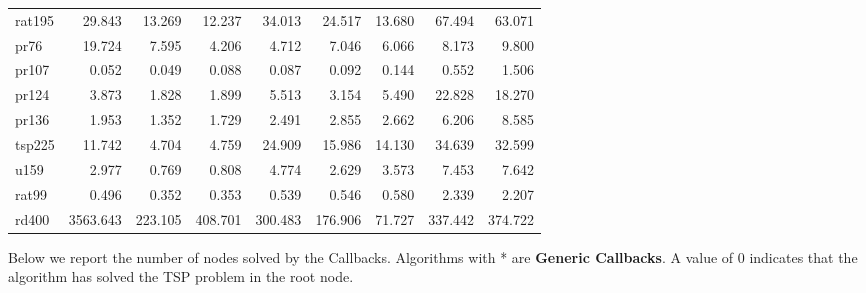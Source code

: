 \begin{center}
\begin{longtable}{lrrrrrrrr}
rat195  & 29.843 & 13.269 & 12.237 & 34.013 & 24.517 & 13.680 & 67.494 & 63.071\\
pr76  & 19.724 & 7.595 & 4.206 & 4.712 & 7.046 & 6.066 & 8.173 & 9.800\\
pr107   & 0.052 & 0.049 & 0.088 & 0.087 & 0.092 & 0.144 & 0.552 & 1.506\\
pr124  & 3.873 & 1.828 & 1.899 & 5.513 & 3.154 & 5.490 & 22.828 & 18.270\\
pr136  & 1.953 & 1.352 & 1.729 & 2.491 & 2.855 & 2.662 & 6.206 & 8.585\\
tsp225  & 11.742 & 4.704 & 4.759 & 24.909 & 15.986 & 14.130 & 34.639 & 32.599\\
u159  & 2.977 & 0.769 & 0.808 & 4.774 & 2.629 & 3.573 & 7.453 & 7.642\\
rat99   & 0.496 & 0.352 & 0.353 & 0.539 & 0.546 & 0.580 & 2.339 & 2.207\\
rd400  & 3563.643 & 223.105 & 408.701 & 300.483 & 176.906 & 71.727 & 337.442 & 374.722\\

\end{longtable}
\end{center}


\setlength\LTleft{0cm}
\noindent
Below we report the number of nodes solved by the Callbacks. Algorithms with * are \textbf{Generic Callbacks}. A value of 0 indicates that the algorithm has solved the TSP problem in the root node.

